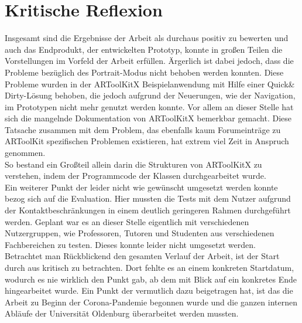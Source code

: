 \section{Kritische Reflexion}\label{sec:reflexion}
Insgesamt sind die Ergebnisse der Arbeit als durchaus positiv zu bewerten und auch das Endprodukt, der entwickelten Prototyp, konnte in großen Teilen die Vorstellungen im Vorfeld der Arbeit erfüllen. Ärgerlich ist dabei jedoch, dass die Probleme bezüglich des Portrait-Modus nicht behoben werden konnten. Diese Probleme wurden in der ARToolKitX Beispielanwendung mit Hilfe einer Quick\& Dirty-Lösung behoben, die jedoch aufgrund der Neuerungen, wie der Navigation, im Prototypen nicht mehr genutzt werden konnte. Vor allem an dieser Stelle hat sich die mangelnde Dokumentation von ARToolKitX bemerkbar gemacht. Diese Tatsache zusammen mit dem Problem, das ebenfalls kaum Forumeinträge zu ARToolKit spezifischen Problemen existieren, hat extrem viel Zeit in Anspruch genommen. \\
So bestand ein Großteil allein darin die Strukturen von ARToolKitX zu verstehen, indem der Programmcode der Klassen durchgearbeitet wurde.\\
Ein weiterer Punkt der leider nicht wie gewünscht umgesetzt werden konnte bezog sich auf die Evaluation. Hier mussten die Tests mit dem Nutzer aufgrund der Kontaktbeschränkungen in einem deutlich geringeren Rahmen durchgeführt werden. Geplant war es an dieser Stelle eigentlich mit verschiedenen Nutzergruppen, wie Professoren, Tutoren und Studenten aus verschiedenen Fachbereichen zu testen. Dieses konnte leider nicht umgesetzt werden.\\
Betrachtet man Rückblickend den gesamten Verlauf der Arbeit, ist der Start durch aus kritisch zu betrachten. Dort fehlte es an einem konkreten Startdatum, wodurch es nie wirklich den Punkt gab, ab dem mit Blick auf ein konkretes Ende hingearbeitet wurde. Ein Punkt der vermutlich dazu beigetragen hat, ist das die Arbeit zu Beginn der Corona-Pandemie begonnen wurde und die ganzen internen Abläufe der Universität Oldenburg überarbeitet werden mussten.\\

